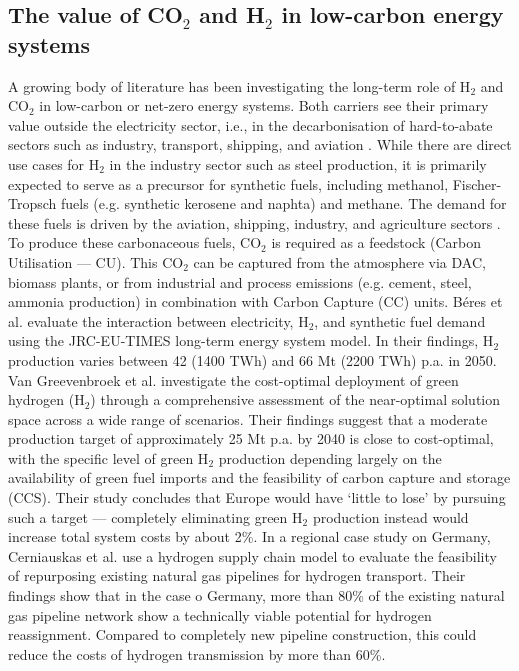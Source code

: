 \documentclass[pdflatex,sn-nature]{sn-jnl}%
\theoremstyle{thmstyleone}%
\theoremstyle{thmstyletwo}%
\theoremstyle{thmstylethree}%
\begin{document}
\subsection{The value of CO$_2$ and H$_2$ in low-carbon energy systems} 
A growing body of literature has been investigating the long-term role of H$_2$ and CO$_2$ in low-carbon or net-zero energy systems. Both carriers see their primary value outside the electricity sector, i.e., in the decarbonisation of hard-to-abate sectors such as industry, transport, shipping, and aviation \cite{reigstadMovingLowcarbonHydrogen2022}. While there are direct use cases for H$_2$ in the industry sector such as steel production, it is primarily expected to serve as a precursor for synthetic fuels, including methanol, Fischer-Tropsch fuels (e.g. synthetic kerosene and naphta) and methane. The demand for these fuels is driven by the aviation, shipping, industry, and agriculture sectors \cite{neumannPotentialRoleHydrogen2023}. To produce these carbonaceous fuels, CO$_2$ is required as a feedstock (Carbon Utilisation --- CU). This CO$_2$ can be captured from the atmosphere via DAC, biomass plants, or from industrial and process emissions (e.g. cement, steel, ammonia production) in combination with Carbon Capture (CC) units.
Béres et al. \cite{beresWillHydrogenSynthetic2024} evaluate the interaction between electricity, H$_2$, and synthetic fuel demand using the JRC-EU-TIMES long-term energy system model. In their findings, H$_2$ production varies between 42 (1400 TWh) and 66 Mt (2200 TWh) p.a. in 2050. 
Van Greevenbroek et al. \cite{greevenbroekLittleLoseCase2024} investigate the cost-optimal deployment of green hydrogen (H$_2$) through a comprehensive assessment of the near-optimal solution space across a wide range of scenarios. Their findings suggest that a moderate production target of approximately 25 Mt p.a. by 2040 is close to cost-optimal, with the specific level of green H$_2$ production depending largely on the availability of green fuel imports and the feasibility of carbon capture and storage (CCS). Their study concludes that Europe would have `little to lose' by pursuing such a target --- completely eliminating green H$_2$ production instead would increase total system costs by about 2\%.
In a regional case study on Germany, Cerniauskas et al. \cite{cerniauskasOptionsNaturalGas2020} use a hydrogen supply chain model \cite{reussSeasonalStorageAlternative2017} to evaluate the feasibility of repurposing existing natural gas pipelines for hydrogen transport. Their findings show that in the case o Germany, more than 80\% of the existing natural gas pipeline network show a technically viable potential for hydrogen reassignment. Compared to completely new pipeline construction, this could reduce the costs of hydrogen transmission by more than 60\%.
\end{document}
